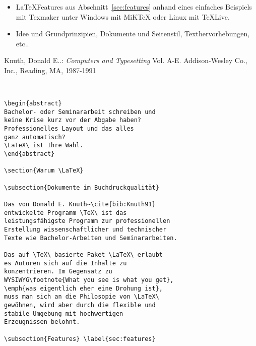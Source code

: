 \documentclass[10pt,a4paper]{article}
\begin{document}
\begin{minipage}{86mm}
\begin{itemize}
\item \LaTeX\-Features aus Abschnitt~\ref{sec:features} anhand
eines einfaches Beispiels mit Texmaker unter Windows mit MiKTeX 
oder Linux mit TeXLive.
\item Idee und Grundprinzipien, Dokumente und Seitenstil,
Texthervorhebungen, etc.\enspace.
\end{itemize}

\begin{thebibliography}{1}
  Knuth, Donald E..:
  \textit{Computers and Typesetting} Vol. A-E.
  Addison-Wesley Co., Inc., Reading, MA, 1987-1991
\end{thebibliography}
\end{minipage}\mbox{\ \ \ }
\begin{minipage}{77mm}
\footnotesize
\begin{verbatim}
\begin{abstract}
Bachelor- oder Seminararbeit schreiben und 
keine Krise kurz vor der Abgabe haben? 
Professionelles Layout und das alles 
ganz automatisch?
\LaTeX\ ist Ihre Wahl.
\end{abstract}

\section{Warum \LaTeX}

\subsection{Dokumente im Buchdruckqualität}

Das von Donald E. Knuth~\cite{bib:Knuth91} 
entwickelte Programm \TeX\ ist das 
leistungsfähigste Programm zur professionellen 
Erstellung wissenschaftlicher und technischer 
Texte wie Bachelor-Arbeiten und Seminararbeiten.

Das auf \TeX\ basierte Paket \LaTeX\ erlaubt 
es Autoren sich auf die Inhalte zu 
konzentrieren. Im Gegensatz zu 
WYSIWYG\footnote{What you see is what you get},
\emph{was eigentlich eher eine Drohung ist},
muss man sich an die Philosopie von \LaTeX\ 
gewöhnen, wird aber durch die flexible und 
stabile Umgebung mit hochwertigen 
Erzeugnissen belohnt. 

\subsection{Features} \label{sec:features}


\end{verbatim}
\end{minipage}
\end{document}
